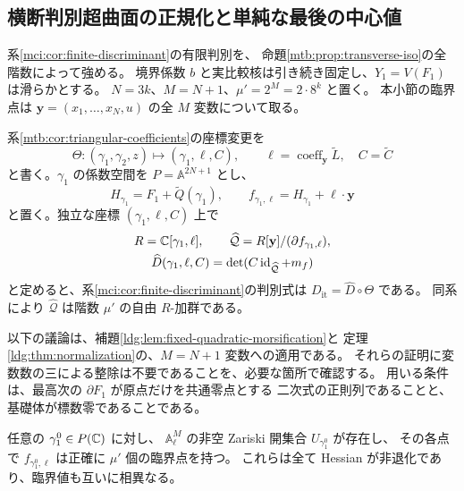 \subsection{横断判別超曲面の正規化と単純な最後の中心値}
\label{mtd:subsec:transverse-discriminant}

系\ref{mci:cor:finite-discriminant}の有限判別を、
命題\ref{mtb:prop:transverse-iso}の全階数によって強める。
境界係数 $b$ と実比較核は引き続き固定し、$Y_1=V(F_1)$ は滑らかとする。
$N=3k$、$M=N+1$、$\mu'=2^M=2\cdot8^k$ と置く。
本小節の臨界点は $\mathbf y=(x_1,\ldots,x_N,u)$ の全 $M$ 変数について取る。

系\ref{mtb:cor:triangular-coefficients}の座標変更を
\begin{equation}\label{mtd:eq:theta}
 \Theta:(\gamma_1,\gamma_2,z)\longmapsto
      (\gamma_1,\ell,C),\qquad
 \ell=\operatorname{coeff}_{\mathbf y}\widetilde L,\quad
 C=\widetilde C
\end{equation}
と書く。$\gamma_1$ の係数空間を $P=\mathbb A^{2N+1}$ とし、
\[
 H_{\gamma_1}=F_1+\widetilde Q(\gamma_1),\qquad
 f_{\gamma_1,\ell}=H_{\gamma_1}+\ell\cdot\mathbf y
\]
と置く。独立な座標 $(\gamma_1,\ell,C)$ 上で
\[
 \begin{gathered}
 R=\mathbb C[\gamma_1,\ell],\qquad
 \widehat{\mathcal Q}=R[\mathbf y]/(\partial f_{\gamma_1,\ell}),\\
 \widehat D(\gamma_1,\ell,C)
       =\det(C\operatorname{id}_{\widehat{\mathcal Q}}+m_f)
 \end{gathered}
\]
と定めると、系\ref{mci:cor:finite-discriminant}の判別式は
$D_{\mathrm{it}}=\widehat D\circ\Theta$ である。
同系により $\widehat{\mathcal Q}$ は階数 $\mu'$ の自由 $R$-加群である。

以下の議論は、補題\ref{ldg:lem:fixed-quadratic-morsification}と
定理\ref{ldg:thm:normalization}の、$M=N+1$ 変数への適用である。
それらの証明に変数数の三による整除は不要であることを、必要な箇所で確認する。
用いる条件は、最高次の $\partial F_1$ が原点だけを共通零点とする
二次式の正則列であることと、基礎体が標数零であることである。

\begin{lemma}[任意の固定一次係数での臨界値分離]
\label{mtd:lem:separated-critical-values}
任意の $\gamma_1^0\in P(\mathbb C)$ に対し、
$\mathbb A^M_\ell$ の非空 Zariski 開集合 $U_{\gamma_1^0}$ が存在し、
その各点で $f_{\gamma_1^0,\ell}$ は正確に $\mu'$ 個の臨界点を持つ。
これらは全て Hessian が非退化であり、臨界値も互いに相異なる。
\end{lemma}

